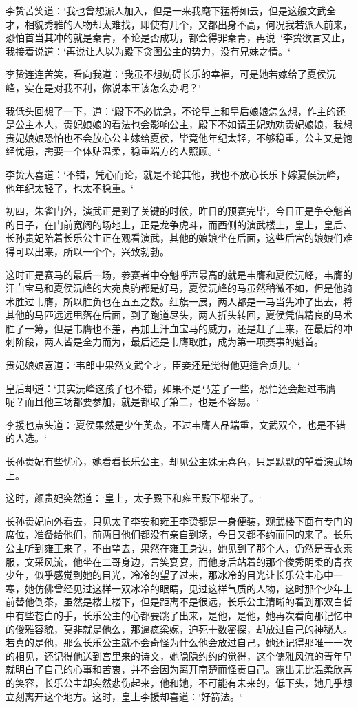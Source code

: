 李贽苦笑道：‘我也曾想派人加入，但是一来我麾下猛将如云，但是这般文武全才，相貌秀雅的人物却太难找，即使有几个，又都出身不高，何况我若派人前来，恐怕首当其冲的就是秦青，不论是否成功，都会得罪秦青，再说--‘李贽欲言又止，我接着说道：‘再说让人以为殿下贪图公主的势力，没有兄妹之情。‘

李贽连连苦笑，看向我道：‘我虽不想妨碍长乐的幸福，可是她若嫁给了夏侯沅峰，实在是对我不利，你说本王该怎么办呢？‘

我低头回想了一下，道：‘殿下不必忧急，不论皇上和皇后娘娘怎么想，作主的还是公主本人，贵妃娘娘的看法也会影响公主，殿下不如请王妃劝劝贵妃娘娘，我想贵妃娘娘恐怕也不会放心公主嫁给夏侯，毕竟他年纪太轻，不够稳重，公主又是饱经忧患，需要一个体贴温柔，稳重端方的人照顾。‘

李贽大喜道：‘不错，凭心而论，就是不论其他，我也不放心长乐下嫁夏侯沅峰，他年纪太轻了，也太不稳重。‘

初四，朱雀门外，演武正是到了关键的时候，昨日的预赛完毕，今日正是争夺魁首的日子，在门前宽阔的场地上，正是龙争虎斗，而西侧的演武楼上，皇上，皇后、长孙贵妃陪着长乐公主正在观看演武，其他的娘娘坐在后面，这些后宫的娘娘们难得可以出来，所以一个个，兴致勃勃。

这时正是赛马的最后一场，参赛者中夺魁呼声最高的就是韦膺和夏侯沅峰，韦膺的汗血宝马和夏侯沅峰的大宛良驹都是好马，夏侯沅峰的马虽然稍微不如，但是他骑术胜过韦膺，所以胜负也在五五之数。红旗一展，两人都是一马当先冲了出去，将其他的马匹远远甩落在后面，到了跑道尽头，两人折头转回，夏侯凭借精良的马术胜了一筹，但是韦膺也不差，再加上汗血宝马的威力，还是赶了上来，在最后的冲刺阶段，两人皆是全力而为，最后还是韦膺取胜，成为第一项赛事的魁首。

贵妃娘娘喜道：‘韦郎中果然文武全才，臣妾还是觉得他更适合贞儿。‘

皇后却道：‘其实沅峰这孩子也不错，如果不是马差了一些，恐怕还会超过韦膺呢？而且他三场都要参加，就是都取了第二，也是不容易。‘

李援也点头道：‘夏侯果然是少年英杰，不过韦膺人品端重，文武双全，也是不错的人选。‘

长孙贵妃有些忧心，她看看长乐公主，却见公主殊无喜色，只是默默的望着演武场上。

这时，颜贵妃突然道：‘皇上，太子殿下和雍王殿下都来了。‘

长孙贵妃向外看去，只见太子李安和雍王李贽都是一身便装，观武楼下面有专门的席位，准备给他们，前两日他们都没有亲自到场，今日又都不约而同的来了。长乐公主听到雍王来了，不由望去，果然在雍王身边，她见到了那个人，仍然是青衣素服，文采风流，他坐在二哥身边，言笑宴宴，而他身后站着的那个俊秀阴柔的青衣少年，似乎感觉到她的目光，冷冷的望了过来，那冰冷的目光让长乐公主心中一寒，她仿佛曾经见过这样一双冰冷的眼睛，见过这样气质的人物，这时那个少年上前替他倒茶，虽然是楼上楼下，但是距离不是很远，长乐公主清晰的看到那双白皙中有些苍白的手，长乐公主的心都要跳了出来，是他，是他，她再次看向那记忆中的俊雅容貌，莫非就是他么，那逼疯梁婉，迫死十数密探，却放过自己的神秘人。若真的是他，那么长乐公主就不会奇怪为什么他会放过自己，她还记得那唯一一次的相见，还记得他送到宫里来的诗文，她隐隐约约的觉得，这个儒雅风流的青年早就明白了自己的心事和苦衷，并不会因为离开南楚而怪责自己。露出无比温柔欣喜的笑容，长乐公主却突然悲伤起来，他和她，不可能有未来的，低下头，她几乎想立刻离开这个地方。这时，皇上李援却喜道：‘好箭法。‘

